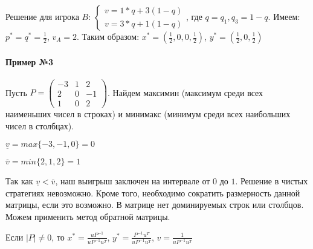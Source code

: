 \documentclass{article}
\begin{document}
Решение для игрока $B$: $\begin{cases}
    v = 1 * q + 3 (1 - q) \\
    v = 3 * q + 1 (1 - q)
\end{cases}$, где $q = q_{1}, q_{3} = 1 - q$. Имеем: $p^{*} = q^{*} = \frac{1}{2}$, $v_{A} = 2$. Таким образом: $x^{*} = ( \frac{1}{2}, 0, 0, \frac{1}{2} )$, $y^{*} = ( \frac{1}{2}, 0, \frac{1}{2} )$

\paragraph{Пример №3} Пусть $P = \begin{pmatrix}
    -3 & 1 & 2 \\
    2 & 0 & -1 \\
    1 & 0 & 2 
\end{pmatrix}$. Найдем максимин (максимум среди всех наименьших чисел в строках) и минимакс (минимум среди всех наибольших чисел в столбцах).

$\underline{v} = max \{ -3, -1, 0 \} = 0$

$\overline{v} = min \{ 2, 1, 2 \} = 1$

Так как $\underline{v} < \overline{v}$, наш выигрыш заключен на интервале от $0$ до $1$. Решение в чистых стратегиях невозможно. Кроме того, необходимо сократить размерность данной матрицы, если это возможно. В матрице нет доминируемых строк или столбцов. Можем применить метод обратной матрицы.

Если $|P| \ne 0$, то $x^{*} = \frac{u P^{-1}}{u P^{-1} u^{T}}$, $y^{*} = \frac{P^{-1} u^{T}}{u P^{-1} u^{T}}$, $v = \frac{1}{u P^{-1} u^{T}}$
\end{document}
